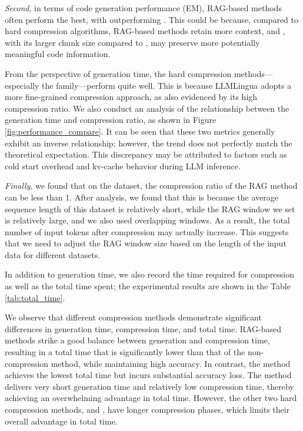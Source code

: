 \textit{Second}, in terms of code generation performance (EM), RAG-based methods often perform the best, with \rag outperforming \ragfunction. This could be because, compared to hard compression algorithms, RAG-based methods retain more context, and \rag, with its larger chunk size compared to \ragfunction, may preserve more potentially meaningful code information.

From the perspective of generation time, the hard compression methods—especially the \llmlingua family—perform quite well. This is because LLMLingua adopts a more fine-grained compression approach, as also evidenced by its high compression ratio. We also conduct an analysis of the relationship between the generation time and compression ratio, as shown in Figure \ref{fig:performance_compare}. It can be seen that these two metrics generally exhibit an inverse relationship; however, the trend does not perfectly match the theoretical expectation. This discrepancy may be attributed to factors such as cold start overhead and kv-cache behavior during LLM inference.


\textit{Finally}, we found that on the \ccevalpython dataset, the compression ratio of the RAG method can be less than 1. After analysis, we found that this is because the average sequence length of this dataset is relatively short, while the RAG window we set is relatively large, and we also used overlapping windows. As a result, the total number of input tokens after compression may actually increase. This suggests that we need to adjust the RAG window size based on the length of the input data for different datasets.


In addition to generation time, we also record the time required for compression as well as the total time spent; the experimental results are shown in the Table \ref{tab:total_time}.

We observe that different compression methods demonstrate significant differences in generation time, compression time, and total time. RAG-based methods strike a good balance between generation and compression time, resulting in a total time that is significantly lower than that of the non-compression method, while maintaining high accuracy. In contrast, the \nocontext method achieves the lowest total time but incurs substantial accuracy loss. The \llmlingua method delivers very short generation time and relatively low compression time, thereby achieving an overwhelming advantage in total time. However, the other two hard compression methods, \longllmlingua and \llmlinguatwo, have longer compression phases, which limits their overall advantage in total time.

